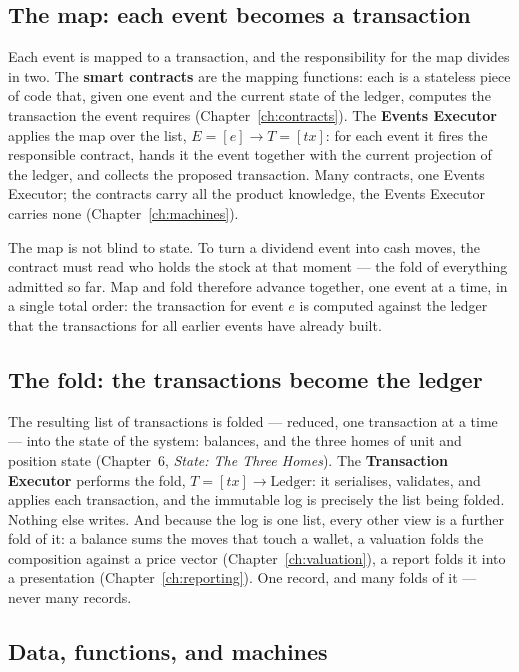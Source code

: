 \subsection{The map: each event becomes a transaction}

Each event is mapped to a transaction, and the responsibility for the map divides in two.
The \textbf{smart contracts} are the mapping functions: each is a stateless piece of code
that, given one event and the current state of the ledger, computes the transaction the
event requires (Chapter~\ref{ch:contracts}). The \textbf{Events Executor} applies the map
over the list, $E=[e] \to T=[tx]$: for each event it fires the responsible contract,
hands it the event together with the current projection of the ledger, and collects the
proposed transaction. Many contracts, one Events Executor; the contracts carry all the
product knowledge, the Events Executor carries none (Chapter~\ref{ch:machines}).

The map is not blind to state. To turn a dividend event into cash moves, the contract
must read who holds the stock at that moment --- the fold of everything admitted so far.
Map and fold therefore advance together, one event at a time, in a single total order:
the transaction for event $e$ is computed against the ledger that the transactions for
all earlier events have already built.

\subsection{The fold: the transactions become the ledger}

The resulting list of transactions is folded --- reduced, one transaction at a time ---
into the state of the system: balances, and the three homes of unit and position state
(Chapter~6, \emph{State: The Three Homes}). The \textbf{Transaction Executor} performs the
fold, $T=[tx] \to \mathrm{Ledger}$: it serialises, validates, and applies each
transaction, and the immutable log is precisely the list being folded. Nothing else
writes. And because the log is one list, every other view is a further fold of it: a
balance sums the moves that touch a wallet, a valuation folds the composition against a
price vector (Chapter~\ref{ch:valuation}), a report folds it into a presentation
(Chapter~\ref{ch:reporting}). One record, and many folds of it --- never many records.

\subsection{Data, functions, and machines}

